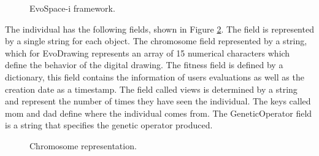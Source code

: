 \begin{figure}
\captionsetup{justification=centering,margin=2cm}
\centering
\setlength\fboxsep{0pt}
\setlength\fboxrule{0.7pt}
\caption{EvoSpace-i framework.}
\label{fig:ESFramework}
\end{figure}


The individual has the following fields, shown in Figure \ref{fig:individual_dic}.
The field is represented by a single string for each object. The chromosome
field represented by a string, which for EvoDrawing represents an array of 15
numerical characters which define the behavior of the digital drawing. The
fitness field is defined by a dictionary, this field contains the information of
users evaluations as well as the creation date as a timestamp. The field called
views is determined by a string and represent the number of times they have seen
the individual. The keys called mom and dad define where the individual comes
from. The GeneticOperator field is a string that specifies the genetic operator
produced.

\begin{figure}
\captionsetup{justification=centering,margin=2cm}
\centering
\setlength\fboxsep{0pt}
\setlength\fboxrule{0.7pt}
\caption{Chromosome representation.}
\label{fig:individual_dic}
\end{figure}


